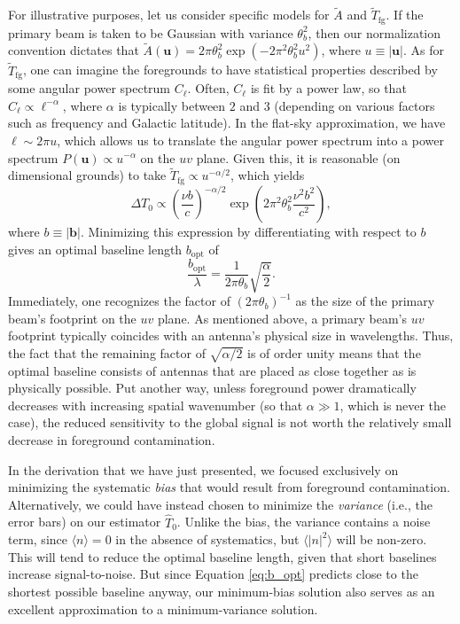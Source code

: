 \documentclass[twocolumn,apj,numberedappendix]{emulateapj}
\begin{document}
For illustrative purposes, let us consider specific models for $\widetilde{A}$ and $\widetilde{T}_\textrm{fg}$.  If the primary beam is taken to be Gaussian with variance $\theta_b^2$, then our normalization convention dictates that $\widetilde{A}(\mathbf{u}) = 2 \pi \theta_b^2 \exp (-2 \pi^2 \theta_b^2 u^2 )$, where $u \equiv |\mathbf{u}|$.  As for $\widetilde{T}_\textrm{fg}$, one can imagine the foregrounds to have statistical properties described by some angular power spectrum $C_\ell$.  Often, $C_\ell$ is fit by a power law, so that $C_\ell \propto \ell^{-\alpha}$, where $\alpha$ is typically between $2$ and $3$ (depending on various factors such as frequency and Galactic latitude).  In the flat-sky approximation, we have $\ell \sim 2 \pi u$, which allows us to translate the angular power spectrum into a power spectrum $P(\mathbf{u}) \propto u^{-\alpha}$ on the $uv$ plane.  Given this, it is reasonable (on dimensional grounds) to take $\widetilde{T}_\textrm{fg} \propto u^{-\alpha/2}$, which yields
\begin{equation}
\label{eq:DeviationPowGauss}
\Delta T_0 \propto \left( \frac{\nu b}{c}\right)^{-\alpha/2} \exp \left(2 \pi^2 \theta_b^2 \frac{\nu^2 b^2}{c^2}  \right),
\end{equation}
where $b \equiv | \mathbf{b} |$.  Minimizing this expression by differentiating with respect to $b$ gives an optimal baseline length $b_\textrm{opt}$ of
\begin{equation}
\label{eq:b_opt}
\frac{b_\textrm{opt}}{\lambda} = \frac{1}{2\pi \theta_b} \sqrt{\frac{\alpha}{2}}.
\end{equation}
Immediately, one recognizes the factor of $(2 \pi \theta_b)^{-1}$ as the size of the primary beam's footprint on the $uv$ plane.  As mentioned above, a primary beam's $uv$ footprint typically coincides with an antenna's physical size in wavelengths. Thus, the fact that the remaining factor of $\sqrt{\alpha / 2}$ is of order unity means that the optimal baseline consists of antennas that are placed as close together as is physically possible.  Put another way, unless foreground power dramatically decreases with increasing spatial wavenumber (so that $\alpha \gg 1$, which is never the case), the reduced sensitivity to the global signal is not worth the relatively small decrease in foreground contamination.

In the derivation that we have just presented, we focused exclusively on minimizing the systematic \emph{bias} that would result from foreground contamination.  Alternatively, we could have instead chosen to minimize the \emph{variance} (i.e., the error bars) on our estimator $\widehat{T}_0$.  Unlike the bias, the variance contains a noise term, since $\langle n \rangle = 0$ in the absence of systematics, but $\langle |n|^2 \rangle$ will be non-zero.  This will tend to reduce the optimal baseline length, given that short baselines increase signal-to-noise.  But since Equation \eqref{eq:b_opt} predicts close to the shortest possible baseline anyway, our minimum-bias solution also serves as an excellent approximation to a minimum-variance solution.
\end{document}
